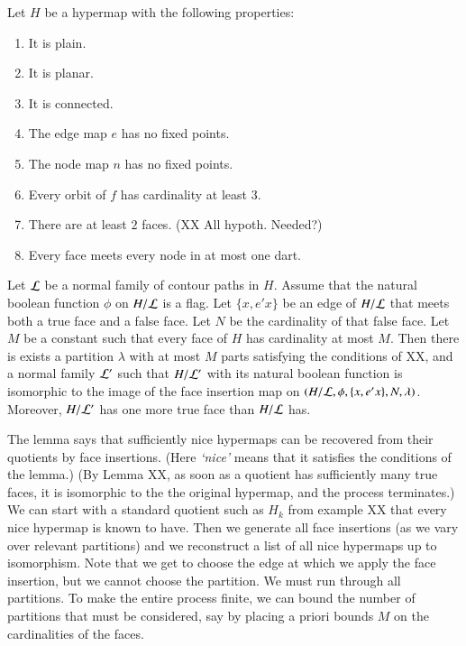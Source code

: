 \begin{lemma}  Let $H$ be a hypermap with the following properties:
    \begin{enumerate}
        \item It is plain.
        \item It is planar.
        \item It is connected.
        \item The edge map $e$ has no fixed points.
        \item The node map $n$ has no fixed points.
        \item Every orbit of $f$ has cardinality at least $3$.
        \item There are at least $2$ faces.  (XX All hypoth. Needed?)
        \item Every face meets every node in at most one
        dart.
    \end{enumerate}
Let $\cal L$ be a normal family of contour paths in $H$. Assume that
the natural boolean function $\phi$ on $H/{\cal L}$ is a flag. Let
$\{x,e' x\}$ be an edge of $H/{\cal L}$ that meets both a true face
and a false face. Let $N$ be the cardinality of that false face. Let
$M$ be a constant such that every face of $H$ has cardinality at
most $M$. Then there is exists a partition $\lambda$ with at most
$M$ parts satisfying the conditions of XX, and a normal family
${\cal L}'$ such that $H/{\cal L}'$ with its natural boolean
function is isomorphic to the image of the face insertion map on
$(H/{\cal L},\phi,\{x,e' x\},N,\lambda)$. Moreover, $H/{\cal L}'$
has one more true face than $H/{\cal L}$ has.
\end{lemma}

\begin{remark} The lemma says that sufficiently nice hypermaps can be recovered
from their quotients by face insertions.  (Here {\it `nice'} means
that it satisfies the conditions of the lemma.)   (By Lemma XX, as
soon as a quotient has sufficiently many true faces, it is
isomorphic to the the original hypermap, and the process
terminates.) We can start with a standard quotient such as $H_k$
from example XX that every nice hypermap is known to have. Then we
generate all face insertions (as we vary over relevant partitions)
and we reconstruct a list of all nice hypermaps up to isomorphism.
Note that we get to choose the edge at which we apply the face
insertion, but we cannot choose the partition.  We must run through
all partitions.  To make the entire process finite, we can bound the
number of partitions that must be considered, say by placing a
priori bounds $M$ on the cardinalities of the faces.
\end{remark}

